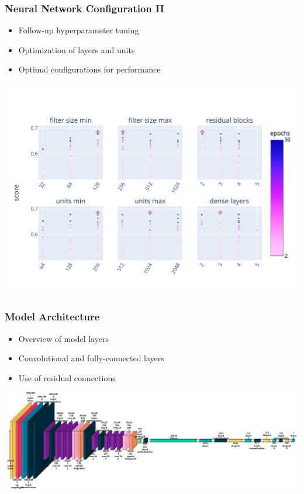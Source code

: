 \documentclass[compress]{beamer}
\begin{document}
\begin{frame}
\frametitle{Neural Network Configuration II}
\begin{itemize}
    \item Follow-up hyperparameter tuning
    \item Optimization of layers and units
    \item Optimal configurations for performance
\end{itemize}
\includegraphics[width=0.9\linewidth, trim={10pt 20pt 15pt 40pt}, clip]{../report/figures/figures_tuner/hyperband_resnet_followup_params.pdf}
\end{frame}

\begin{frame}
\frametitle{Model Architecture}
\begin{itemize}
    \item Overview of model layers
    \item Convolutional and fully-connected layers
    \item Use of residual connections
\end{itemize}
\includegraphics[width=0.99\linewidth]{../report/figures/figures_tuner/model_layered_view_together.png}
\end{frame}
\end{document}
